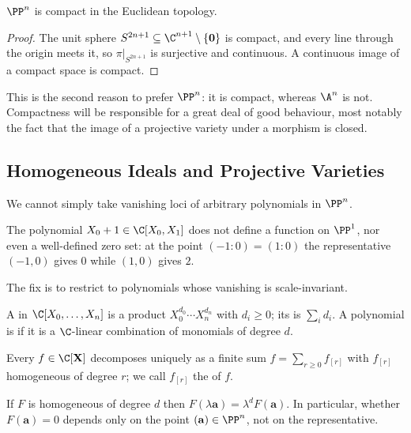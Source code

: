 \begin{proposition}
	$\PP^n$ is compact in the Euclidean topology.
\end{proposition}

\begin{proof}
	The unit sphere $S^{2n+1} \subseteq \C^{n+1}\setminus\{\mathbf 0\}$ is compact, and every line through the origin meets it, so $\pi|_{S^{2n+1}}$ is surjective and continuous. A continuous image of a compact space is compact.
\end{proof}

This is the second reason to prefer $\PP^n$: it is compact, whereas $\A^n$ is not. Compactness will be responsible for a great deal of good behaviour, most notably the fact that the image of a projective variety under a morphism is closed.

\subsection{Homogeneous Ideals and Projective Varieties}

We cannot simply take vanishing loci of arbitrary polynomials in $\PP^n$.

\begin{example}
	The polynomial $X_0 + 1 \in \C[X_0,X_1]$ does not define a function on $\PP^1$, nor even a well-defined zero set: at the point $(-1:0) = (1:0)$ the representative $(-1,0)$ gives $0$ while $(1,0)$ gives $2$.
\end{example}

The fix is to restrict to polynomials whose vanishing is scale-invariant.

\begin{definition}
	A  in $\C[X_0,\dots,X_n]$ is a product $X_0^{d_0}\cdots X_n^{d_n}$ with $d_i \geq 0$; its  is $\sum_i d_i$. A polynomial is  if it is a $\C$-linear combination of monomials of degree $d$.
\end{definition}

Every $f \in \C[\mathbf X]$ decomposes uniquely as a finite sum $f = \sum_{r \geq 0} f_{[r]}$ with $f_{[r]}$ homogeneous of degree $r$; we call $f_{[r]}$ the  of $f$.

\begin{lemma}
	If $F$ is homogeneous of degree $d$ then $F(\lambda \mathbf{a}) = \lambda^d F(\mathbf a)$. In particular, whether $F(\mathbf a) = 0$ depends only on the point $(\mathbf a) \in \PP^n$, not on the representative.
\end{lemma}

